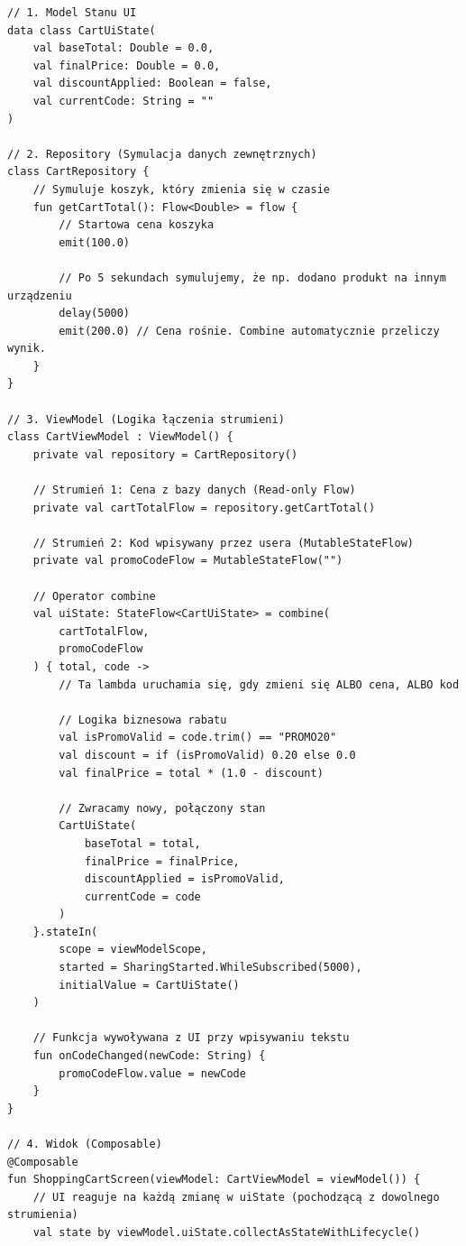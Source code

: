 \begin{verbatim}
// 1. Model Stanu UI
data class CartUiState(
    val baseTotal: Double = 0.0,
    val finalPrice: Double = 0.0,
    val discountApplied: Boolean = false,
    val currentCode: String = ""
)

// 2. Repository (Symulacja danych zewnętrznych)
class CartRepository {
    // Symuluje koszyk, który zmienia się w czasie
    fun getCartTotal(): Flow<Double> = flow {
        // Startowa cena koszyka
        emit(100.0) 
        
        // Po 5 sekundach symulujemy, że np. dodano produkt na innym urządzeniu
        delay(5000) 
        emit(200.0) // Cena rośnie. Combine automatycznie przeliczy wynik.
    }
}

// 3. ViewModel (Logika łączenia strumieni)
class CartViewModel : ViewModel() {
    private val repository = CartRepository()

    // Strumień 1: Cena z bazy danych (Read-only Flow)
    private val cartTotalFlow = repository.getCartTotal()

    // Strumień 2: Kod wpisywany przez usera (MutableStateFlow)
    private val promoCodeFlow = MutableStateFlow("")

    // Operator combine
    val uiState: StateFlow<CartUiState> = combine(
        cartTotalFlow,
        promoCodeFlow
    ) { total, code ->
        // Ta lambda uruchamia się, gdy zmieni się ALBO cena, ALBO kod
        
        // Logika biznesowa rabatu
        val isPromoValid = code.trim() == "PROMO20"
        val discount = if (isPromoValid) 0.20 else 0.0
        val finalPrice = total * (1.0 - discount)

        // Zwracamy nowy, połączony stan
        CartUiState(
            baseTotal = total,
            finalPrice = finalPrice,
            discountApplied = isPromoValid,
            currentCode = code
        )
    }.stateIn(
        scope = viewModelScope,
        started = SharingStarted.WhileSubscribed(5000),
        initialValue = CartUiState()
    )

    // Funkcja wywoływana z UI przy wpisywaniu tekstu
    fun onCodeChanged(newCode: String) {
        promoCodeFlow.value = newCode
    }
}

// 4. Widok (Composable)
@Composable
fun ShoppingCartScreen(viewModel: CartViewModel = viewModel()) {
    // UI reaguje na każdą zmianę w uiState (pochodzącą z dowolnego strumienia)
    val state by viewModel.uiState.collectAsStateWithLifecycle()


\end{verbatim}
